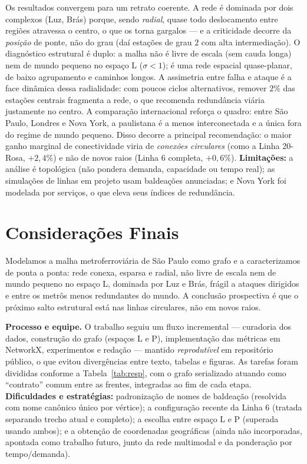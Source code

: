 \documentclass[12pt]{article}
\begin{document}
Os resultados convergem para um retrato coerente. A rede é dominada por dois
complexos (Luz, Brás) porque, sendo \emph{radial}, quase todo deslocamento entre
regiões atravessa o centro, o que os torna gargalos --- e a criticidade decorre
da \emph{posição} de ponte, não do grau (daí estações de grau $2$ com alta
intermediação). O diagnóstico estrutural é duplo: a malha não é livre de escala
(sem cauda longa) nem de mundo pequeno no espaço L ($\sigma<1$); é uma rede
espacial quase-planar, de baixo agrupamento e caminhos longos. A assimetria entre
falha e ataque é a face dinâmica dessa radialidade: com poucos ciclos
alternativos, remover $2\%$ das estações centrais fragmenta a rede, o que
recomenda redundância viária justamente no centro. A comparação internacional
reforça o quadro: entre São Paulo, Londres e Nova York, a paulistana é a menos
interconectada e a única fora do regime de mundo pequeno. Disso decorre a
principal recomendação: o maior ganho marginal de conectividade viria de
\emph{conexões circulares} (como a Linha 20-Rosa, $+2{,}4\%$) e não de novos raios
(Linha 6 completa, $+0{,}6\%$). \textbf{Limitações:} a análise é topológica (não
pondera demanda, capacidade ou tempo real); as simulações de linhas em projeto
usam baldeações anunciadas; e Nova York foi modelada por serviços, o que eleva
seus índices de redundância.

\section{Considerações Finais}

Modelamos a malha metroferroviária de São Paulo como grafo e a caracterizamos de
ponta a ponta: rede conexa, esparsa e radial, não livre de escala nem de mundo
pequeno no espaço L, dominada por Luz e Brás, frágil a ataques dirigidos e entre
os metrôs menos redundantes do mundo. A conclusão prospectiva é que o próximo
salto estrutural está nas linhas circulares, não em novos raios.

\textbf{Processo e equipe.} O trabalho seguiu um fluxo incremental --- curadoria
dos dados, construção do grafo (espaços L e P), implementação das métricas em
NetworkX, experimentos e redação --- mantido \emph{reprodutível} em repositório
público, o que evitou divergências entre texto, tabelas e figuras. As tarefas
foram divididas conforme a Tabela~\ref{tab:resp}, com o grafo serializado atuando
como ``contrato'' comum entre as frentes, integradas ao fim de cada etapa.
\textbf{Dificuldades e estratégias:} padronização de nomes de baldeação
(resolvida com nome canônico único por vértice); a configuração recente da Linha
6 (tratada separando trecho atual e completo); a escolha entre espaço L e P
(superada usando ambos); e a obtenção de coordenadas geográficas (ainda não
incorporadas, apontada como trabalho futuro, junto da rede multimodal e da
ponderação por tempo/demanda).
\end{document}
